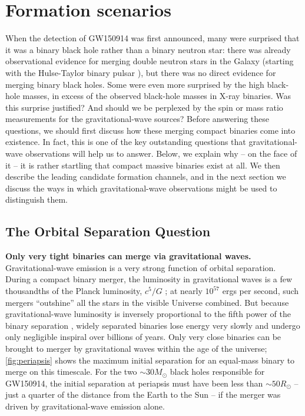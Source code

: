 \documentclass[review]{elsarticle}
\begin{document}
\section{Formation scenarios}\label{form}

When the detection of GW150914 was first announced, many were surprised that it was a binary black hole rather than a binary neutron star: there was already observational evidence for merging double neutron stars in the Galaxy (starting with the Hulse-Taylor binary pulsar \citep{HulseTaylor:1975}), but there was no direct evidence for merging binary black holes. Some were even more surprised by the high black-hole masses, in excess of the observed black-hole masses in X-ray binaries. Was this surprise justified? And should we be perplexed by the spin or mass ratio measurements for the gravitational-wave sources? Before answering these questions, we should first discuss how these merging compact binaries come into existence. In fact, this is one of the key outstanding questions that gravitational-wave observations will help us to answer. Below, we explain why -- on the face of it -- it is rather startling that compact massive binaries exist at all. We then describe the leading candidate formation channels, and in the next section we discuss the ways in which gravitational-wave observations might be used to distinguish them.


\subsection{The Orbital Separation Question}


\textbf{Only very tight binaries can merge via gravitational waves.} Gravitational-wave emission is a very strong function of orbital separation. During a compact binary merger, the luminosity in gravitational waves is a few thousandths of the Planck luminosity, $c^5/G$ \citep[e.g.,][]{Cardoso:2018}; at nearly $10^{57}$ ergs per second, such mergers ``outshine'' all the stars in the visible Universe combined. But because gravitational-wave luminosity is inversely proportional to the fifth power of the binary separation \citep{Peters:1964}, widely separated binaries lose energy very slowly and undergo only negligible inspiral over billions of years. Only very close binaries can be brought to merger by gravitational waves within the age of the universe; \autoref{fig:periapsis} shows the maximum initial separation for an equal-mass binary to merge on this timescale. For the two $\sim 30 M_\odot$ black holes responsible for GW150914, the initial separation at periapsis must have been less than $\sim 50 R_\odot$ -- just a quarter of the distance from the Earth to the Sun -- if the merger was driven by gravitational-wave emission alone.
\end{document}
